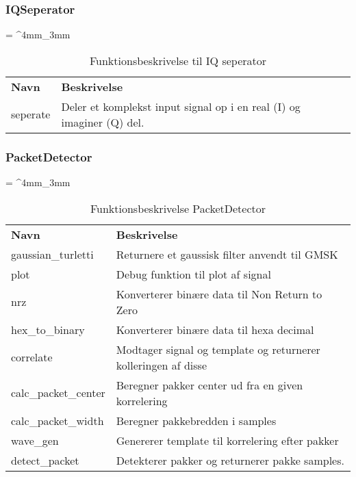\begin{appendices}
\subsubsection{IQSeperator}
\begin{table}[H]
	\renewcommand{\arraystretch}{2}
	\centering
	\sffamily
	\tabulinesep = ^4mm_3mm
	\begin{tabu}{ m{4cm}  m{8.5cm} }
		\color{white}\bfseries Navn &\color{white}\bfseries Beskrivelse \\
		seperate & Deler et komplekst input signal op i en real (I) og imaginer (Q) del. \\
	\end{tabu}
	\caption{Funktionsbeskrivelse til IQ seperator}
	\label{tab:func_descr_IQSeperator}
\end{table}

\subsubsection{PacketDetector}
\begin{table}[H]
	\renewcommand{\arraystretch}{2}
	\centering
	\sffamily
	\tabulinesep = ^4mm_3mm
	\begin{tabu}{ m{4cm}  m{8.5cm} }
		\color{white}\bfseries Navn &\color{white}\bfseries Beskrivelse \\
		gaussian\_turletti & Returnere et gaussisk filter anvendt til GMSK \\
		plot & Debug funktion til plot af signal \\
		nrz & Konverterer binære data til Non Return to Zero \\
		hex\_to\_binary & Konverterer binære data til hexa decimal \\
		correlate & Modtager signal og template og returnerer kolleringen af disse \\
		calc\_packet\_center & Beregner pakker center ud fra en given korrelering \\
		calc\_packet\_width & Beregner pakkebredden i samples  \\
		wave\_gen & Genererer template til korrelering efter pakker \\
		detect\_packet & Detekterer pakker og returnerer pakke samples. \\
	\end{tabu}
	\caption{Funktionsbeskrivelse PacketDetector}
	\label{tab:func_descr_PacketDetector}
\end{table}
\pagebreak 


\end{appendices}
